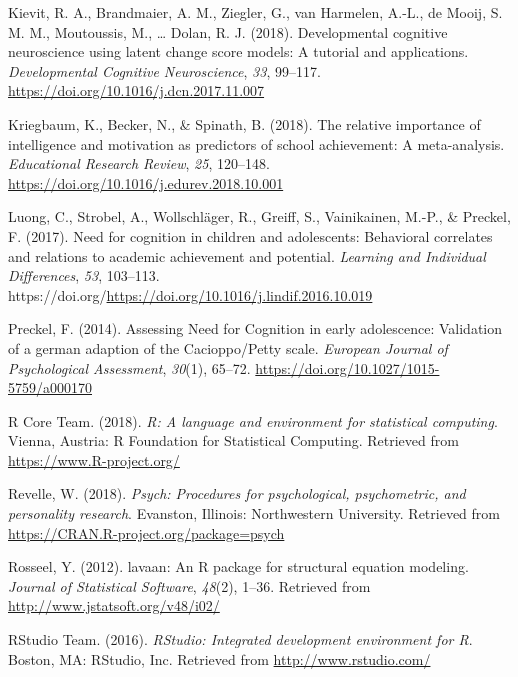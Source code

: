 \documentclass[
  man]{apa6}
\newlength{\cslhangindent}
\newlength{\cslentryspacingunit} %
\newenvironment{CSLReferences}[2] %
 {%
  \setlength{\parindent}{0pt}
  \ifodd #1
  \let\oldpar\par
  \def\par{\hangindent=\cslhangindent\oldpar}
  \fi
  \setlength{\parskip}{#2\cslentryspacingunit}
 }%
 {}
\begin{document}
\begin{CSLReferences}{1}{0}
\leavevmode{}%
Kievit, R. A., Brandmaier, A. M., Ziegler, G., van Harmelen, A.-L., de Mooij, S. M. M., Moutoussis, M., \ldots{} Dolan, R. J. (2018). Developmental cognitive neuroscience using latent change score models: A tutorial and applications. \emph{Developmental Cognitive Neuroscience}, \emph{33}, 99--117. \url{https://doi.org/10.1016/j.dcn.2017.11.007}

\leavevmode{}%
Kriegbaum, K., Becker, N., \& Spinath, B. (2018). The relative importance of intelligence and motivation as predictors of school achievement: A meta-analysis. \emph{Educational Research Review}, \emph{25}, 120--148. \url{https://doi.org/10.1016/j.edurev.2018.10.001}

\leavevmode{}%
Luong, C., Strobel, A., Wollschläger, R., Greiff, S., Vainikainen, M.-P., \& Preckel, F. (2017). Need for cognition in children and adolescents: Behavioral correlates and relations to academic achievement and potential. \emph{Learning and Individual Differences}, \emph{53}, 103--113. https://doi.org/\url{https://doi.org/10.1016/j.lindif.2016.10.019}

\leavevmode{}%
Preckel, F. (2014). Assessing {Need} for {Cognition} in early adolescence: Validation of a german adaption of the {Cacioppo}/{Petty} scale. \emph{European Journal of Psychological Assessment}, \emph{30}(1), 65--72. \url{https://doi.org/10.1027/1015-5759/a000170}

\leavevmode{}%
R Core Team. (2018). \emph{R: A language and environment for statistical computing}. Vienna, Austria: R Foundation for Statistical Computing. Retrieved from \url{https://www.R-project.org/}

\leavevmode{}%
Revelle, W. (2018). \emph{Psych: Procedures for psychological, psychometric, and personality research}. Evanston, Illinois: Northwestern University. Retrieved from \url{https://CRAN.R-project.org/package=psych}

\leavevmode{}%
Rosseel, Y. (2012). {lavaan}: An {R} package for structural equation modeling. \emph{Journal of Statistical Software}, \emph{48}(2), 1--36. Retrieved from \url{http://www.jstatsoft.org/v48/i02/}

\leavevmode{}%
RStudio Team. (2016). \emph{RStudio: Integrated development environment for {R}}. Boston, MA: RStudio, Inc. Retrieved from \url{http://www.rstudio.com/}


\end{CSLReferences}
\end{document}
